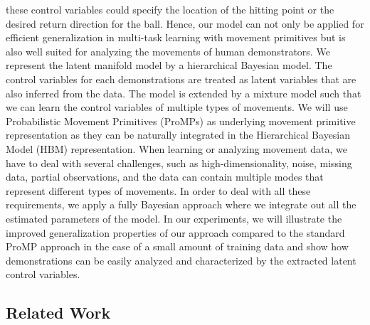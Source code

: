 these control variables could specify the location of the hitting point or the desired return direction for the ball. 
Hence, our model can not only be applied for efficient generalization in multi-task learning with movement primitives but is also well suited 
for analyzing the movements of human demonstrators. We represent the latent manifold model by a hierarchical Bayesian model. The control
variables for each demonstrations are treated as latent variables that are also inferred from the data. The model 
is extended by a mixture model such that we can learn the control variables of multiple types of movements. We will use 
Probabilistic Movement Primitives (ProMPs)  as underlying movement primitive representation as they can be naturally integrated
in the Hierarchical Bayesian Model (HBM) representation. When learning or analyzing movement data, we have to deal
with several challenges, such as high-dimensionality, noise, missing data, partial observations, and the data can 
contain multiple modes that represent different types of movements. In order to deal with all these requirements, we 
apply a fully Bayesian approach where we integrate out all the estimated parameters of the model. In our experiments, we will
illustrate the improved generalization properties of our approach compared to the standard ProMP approach in the case of a small 
amount of training data and show how demonstrations can be easily analyzed and characterized by the extracted latent control variables. 




\subsection{Related Work}

